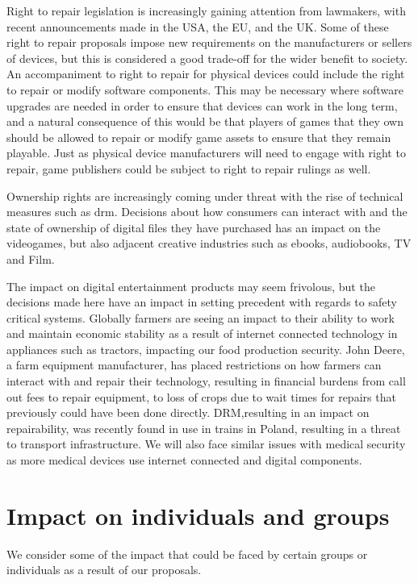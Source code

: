 Right to repair legislation is increasingly gaining attention from lawmakers, with recent announcements made in the USA\cite{us-repair-2024}, the EU\cite{eu-repair-2024}, and the UK\cite{uk-repair-2021}.
Some of these right to repair proposals impose new requirements on the manufacturers or sellers of devices, but this is considered a good trade-off for the wider benefit to society.
An accompaniment to right to repair for physical devices could include the right to repair or modify software components.
This may be necessary where software upgrades are needed in order to ensure that devices can work in the long term,
and a natural consequence of this would be that players of games that they own should be allowed to repair or modify game \glspl{asset} to ensure that they remain playable.
Just as physical device manufacturers will need to engage with right to repair, game publishers could be subject to right to repair rulings as well.

Ownership rights are increasingly coming under threat with the rise of technical measures such as \gls{drm}.
Decisions about how consumers can interact with and the state of ownership of  digital files they have purchased has an impact on the videogames,
but also adjacent creative industries such as ebooks, audiobooks, TV and Film.

The impact on digital entertainment products may seem frivolous,
but the decisions made here have an impact in setting precedent with regards to safety critical systems.
Globally farmers are seeing an impact to their ability to work and maintain economic stability as a result of internet connected technology in appliances such as tractors, impacting our food production security.
John Deere, a farm equipment manufacturer, has placed restrictions on how farmers can interact with and repair their technology,
resulting in financial burdens from call out fees to repair equipment\cn, to loss of crops due to wait times for repairs that previously could have been done directly\cn.
DRM,resulting in an impact on repairability, was recently found in use in trains in Poland, resulting in  a threat to transport infrastructure.
We will also face similar issues with medical security as more medical devices use internet connected and digital components\cn.

\section{Impact on individuals and groups}
We consider some of the impact that could be faced by certain groups or individuals as a result of our proposals.

